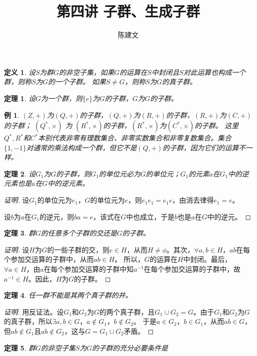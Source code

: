 \documentclass{article}
\newtheorem{Def}{定义}
\newtheorem{Thm}{定理}
\newtheorem*{Example}{例}
\begin{document}
\begin{CJK*}{UTF8}{gbsn}
  \title{第四讲 子群、生成子群}
  \author{陈建文}
  \maketitle
 \begin{Def}
  设$S$为群$G$的非空子集，如果$G$的运算在$S$中封闭且$S$对此运算也构成一个群，则称$S$为$G$的一个子群。
  如果$S\neq G$，则称$S$为$G$的真子群。
 \end{Def} 
\begin{Thm}
设$G$为一个群，则$\{e\}$为$G$的子群，$G$为$G$的子群。
\end{Thm}
\begin{Example}
  $(Z,+)$为$(Q,+)$的子群，$(Q,+)$为$(R,+)$的子群，$(R,+)$为$(C,+)$的子群；
  $(Q^*,\times)$ 为 $(R^*,\times)$的子群，$(R^*,\times)$为$(C^*,\times)$的子群。
  这里$Q^*,R^*$和$C^*$本别代表非零有理数集合、非零实数集合和非零复数集合。集合$\{1,-1\}$对通常的乘法构成一个群，但它不是$(Q,+)$的子群，因为它们的运算不一样。
\end{Example}

 \begin{Thm}
  设$G_1$为$G$的子群，则$G_1$的单位元必为$G$的单位元；$G_1$的元素$a$在$G_1$中的逆元素也是$a$在$G$中的逆元素。
 \end{Thm}
\begin{proof}[证明]
  设$G_1$的单位元为$e_1$，$G$的单位元为$e$，则$e_1e_1=e_1e$，由消去律得$e_1=e$。

  设$b$为$a$在$G_1$的逆元，则$ba=e$，该式在$G$中也成立，于是$b$也是$a$在$G$中的逆元。
\end{proof}
 \begin{Thm}
  群$G$的任意多个子群的交还是$G$的子群。
 \end{Thm}
\begin{proof}[证明]
  设$H$为$G$的一些子群的交，则$e\in H$，从而$H\neq \phi$。其次，$\forall a,b\in H$，$ab$在每个参加交运算的子群中，从而$ab\in H$。
  所以，$G$的运算在$H$中封闭。最后，$\forall a\in H$，由$a$在每个参加交运算的子群中知$a^{-1}$在每个参加交运算的子群中，故$a^{-1}\in H$。因此，$H$为$G$的子群。
\end{proof}
 \begin{Thm}
  任一群不能是其两个真子群的并。
 \end{Thm}
\begin{proof}[证明]
  用反证法。设$G_1$和$G_2$为$G$的两个真子群，且$G_1\cup G_2=G$。由于$G_1$和$G_2$为$G$的真子群，所以$\exists a,b\in G$，$a\notin G_1$，$b\notin G_2$。
  于是$a\in G_2$，$b\in G_1$，从而$ab\in G$，但$ab\notin G_1$且$ab\notin G_2$，这与$G=G_1\cup G_2$矛盾。
\end{proof}
 \begin{Thm}
  群$G$的非空子集$S$为$G$的子群的充分必要条件是


\end{Thm}
\end{CJK*}
\end{document}
